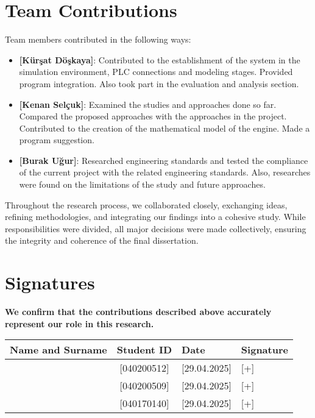 \section*{Team Contributions}
Team members contributed in the following ways:
\begin{itemize}
    \item \textbf{[Kürşat Döşkaya]}: Contributed to the establishment of the system in the simulation environment, PLC connections and modeling stages. Provided program integration. Also took part in the evaluation and analysis section.
    \item \textbf{[Kenan Selçuk]}: Examined the studies and approaches done so far. Compared the proposed approaches with the approaches in the project. Contributed to the creation of the mathematical model of the engine. Made a program suggestion.
    \item \textbf{[Burak Uğur]}: Researched engineering standards and tested the compliance of the current project with the related engineering standards. Also, researches were found on the limitations of the study and future approaches.
\end{itemize}

Throughout the research process, we collaborated closely, exchanging ideas, refining methodologies, and integrating our findings into a cohesive study. While responsibilities were divided, all major decisions were made collectively, ensuring the integrity and coherence of the final dissertation.

\clearpage
\section*{Signatures}
\textbf{We confirm that the contributions described above accurately represent our role in this research.}
%
%
\renewcommand{\arraystretch}{2} %
\begin{table}[http]
    \centering
    \begin{tabular}{|l|c|m{3cm}|m{4cm}|} %
        \hline
        \textbf{Name and Surname} & \textbf{Student ID} & \textbf{Date} & \textbf{Signature} \\
        \hline
        [Kürşat Döşkaya] & [040200512] & [29.04.2025] & [+]\\
        \hline
        [Kenan Selçuk] & [040200509] & [29.04.2025] & [+]\\
        \hline
        [Burak Uğur] & [040170140] & [29.04.2025] & [+]\\
         \hline
    \end{tabular}
\end{table}
%
%
%
%
%
